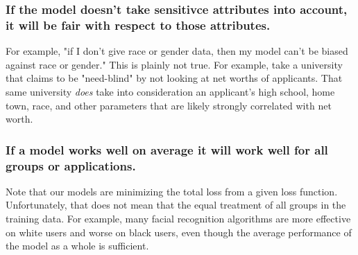 \documentclass[titlepage, 12pt, leqno]{article}
\begin{document}
\subsubsection{If the model doesn't take sensitivce attributes into account, it
will be fair with respect to those attributes.}
For example, "if I don't give race or gender data, then my model can't be biased
against race or gender." This is plainly not true. For example, take a 
university that claims to be "need-blind" by not looking at net worths of
applicants. That same university \textit{does} take into consideration an
applicant's high school, home town, race, and other parameters that are likely
strongly correlated with net worth.

\subsubsection{If a model works well on average it will work well for all groups
or applications.}
Note that our models are minimizing the total loss from a given loss function.
Unfortunately, that does not mean that the equal treatment of all groups in the
training data. For example, many facial recognition algorithms are more 
effective on white users and worse on black users, even though the average
performance of the model as a whole is sufficient.
\end{document}
